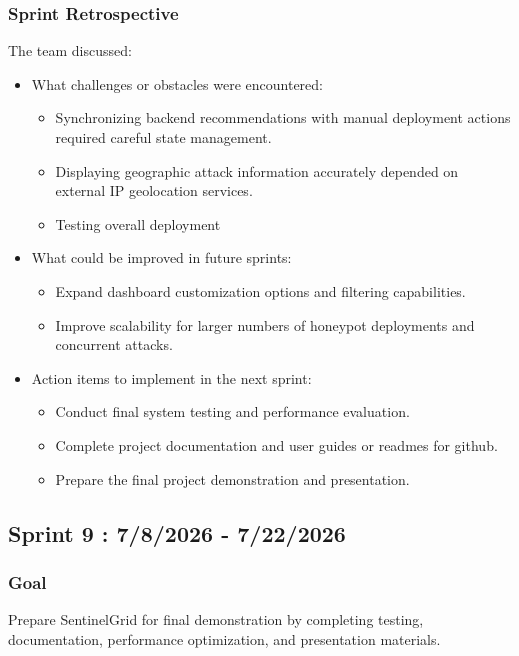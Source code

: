 \documentclass{article}
\begin{document}
\subsubsection{Sprint Retrospective}
The team discussed:

\begin{itemize}
    \item What challenges or obstacles were encountered:
    \begin{itemize}
        \item Synchronizing backend recommendations with manual deployment actions required careful state management.
        \item Displaying geographic attack information accurately depended on external IP geolocation services.
        \item Testing overall deployment
    \end{itemize}

    \item What could be improved in future sprints:
    \begin{itemize}
        \item Expand dashboard customization options and filtering capabilities.
        \item Improve scalability for larger numbers of honeypot deployments and concurrent attacks.
    \end{itemize}
    \item Action items to implement in the next sprint:
     \begin{itemize}
        \item Conduct final system testing and performance evaluation.
        \item Complete project documentation and user guides or readmes for github.
        \item Prepare the final project demonstration and presentation.
    \end{itemize}
\end{itemize}


\subsection{Sprint 9 : 7/8/2026 - 7/22/2026}
\subsubsection{Goal}
Prepare SentinelGrid for final demonstration by completing testing, documentation, performance optimization, and presentation materials.
\end{document}

